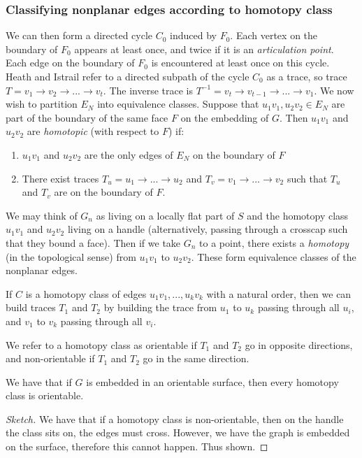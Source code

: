 \subsubsection{Classifying nonplanar edges according to homotopy class}

We can then form a directed cycle $C_0$ induced by $F_0$. Each vertex on the boundary of $F_0$ appears at least once, and twice if it is an \textit{articulation point}. Each edge on the boundary of $F_0$ is encountered at least once on this cycle. Heath and Istrail refer to a directed subpath of the cycle $C_0$ as a trace, so trace $T = v_1 \rightarrow v_2 \rightarrow ... \rightarrow v_t$. The inverse trace is $T^{-1} = v_t \rightarrow v_{t-1} \rightarrow ... \rightarrow v_1$. We now wish to partition $E_N$ into equivalence classes. Suppose that $u_1v_1, u_2v_2 \in E_N$ are part of the boundary of the same face $F$ on the embedding of $G$. Then $u_1v_1$ and $u_2v_2$ are \textit{homotopic} (with respect to $F$) if:
\begin{enumerate}
	\item $u_1v_1$ and $u_2v_2$ are the only edges of $E_N$ on the boundary of $F$
	\item There exist traces $T_u = u_1 \rightarrow ... \rightarrow u_2$ and $T_v = v_1 \rightarrow ... \rightarrow v_2$ such that $T_u$ and $T_v$ are on the boundary of $F$.
\end{enumerate}
We may think of $G_n$ as living on a locally flat part of $S$ and the homotopy class $u_1v_1$ and $u_2 v_2$ living on a handle (alternatively, passing through a crosscap such that they bound a face). Then if we take $G_n$ to a point, there exists a \textit{homotopy} (in the topological sense) from $u_1v_1$ to $u_2v_2$. These form equivalence classes of the nonplanar edges.

\begin{lemma}
	If $C$ is a homotopy class of edges $u_1v_1, ..., u_kv_k$ with a natural order, then we can build traces $T_1$ and $T_2$ by building the trace from $u_1$ to $u_k$ passing through all $u_i$, and $v_1$ to $v_k$ passing through all $v_i$. 
\end{lemma}
We refer to a homotopy class as orientable if $T_1$ and $T_2$ go in opposite directions, and non-orientable if $T_1$ and $T_2$ go in the same direction.

\begin{lemma}
	We have that if $G$ is embedded in an orientable surface, then every homotopy class is orientable.
\end{lemma}
\begin{proof}[Sketch]
	We have that if a homotopy class is non-orientable, then on the handle the class sits on, the edges must cross. However, we have the graph is embedded on the surface, therefore this cannot happen. Thus shown. 
\end{proof}

